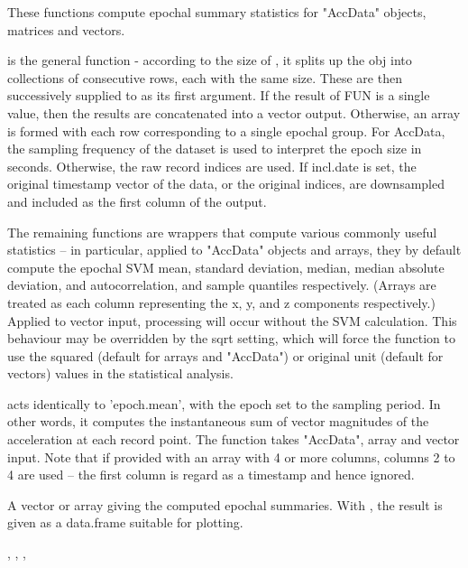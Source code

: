\documentclass[a4paper]{book}
\begin{document}
%
\begin{Details}\relax
These functions compute epochal summary statistics for "AccData" objects, matrices and vectors.

 is the general function - according to the size of , it splits up the obj into collections of consecutive rows, each with the same size. These are then successively supplied to  as its first argument. If the result of FUN is a single value, then the results are concatenated into a vector output. Otherwise, an array is formed with each row corresponding to a single epochal group. For AccData, the sampling frequency of the dataset is used to interpret the epoch size in seconds. Otherwise, the raw record indices are used. If incl.date is set, the original timestamp vector of the data, or the original indices, are downsampled and included as the first column of the output.

The remaining functions are wrappers that compute various commonly useful statistics -- in particular, applied to "AccData" objects and arrays, they by default compute the epochal SVM mean, standard deviation, median, median absolute deviation, and autocorrelation, and sample quantiles respectively. (Arrays are treated as each column representing the x, y, and z components respectively.) Applied to vector input, processing will occur without the SVM calculation. This behaviour may be overridden by the sqrt setting, which will force the function to use the squared (default for arrays and "AccData") or original unit (default for vectors) values in the statistical analysis.

 acts identically to 'epoch.mean', with the epoch set to the sampling period. In other words, it computes the instantaneous sum of vector magnitudes of the acceleration at each record point. The function takes "AccData", array and vector input. Note that if provided with an array with 4 or more columns, columns 2 to 4 are used -- the first column is regard as a timestamp and hence ignored.
\end{Details}
%
\begin{Value}
A vector or array giving the computed epochal summaries. With , the result is given as a data.frame suitable for plotting.
\end{Value}
%
\begin{SeeAlso}\relax
{}, , , 
\end{SeeAlso}
\end{document}
